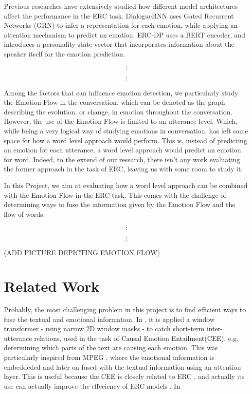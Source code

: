\documentclass[oneside, a4paper, onecolumn, 11pt]{article}
\begin{document}
Previous researches have extensively studied how different model architectures affect the performance in the ERC task. 
DialogueRNN \cite{majumder2019dialoguernnattentivernnemotion} uses Gated Recurrent Networks (GRN) to infer a representation for 
each emotion, while applying an attention mechanism to predict an emotion. ERC-DP \cite{wang2021t2vladgloballocalsequencealignment} 
uses a BERT encoder, and introduces a personality state vector that incorporates information about the speaker itself for the 
emotion prediction.



$$\vdots$$

$$\vdots$$

Among the factors that can influence emotion detection, we particularly study the Emotion Flow in the conversation, which can be
denoted as the graph describing the evolution, or change, in emotion throughout the conversation. However, the use of the Emotion 
Flow is limited to an utterance level. Which, while being a very logical way of studying emotions in conversation, has left some 
space for how a word level approach would perform. This is, instead of predicting an emotion for each utterance, a word level approach 
would predict an emotion for word. Indeed, to the extend of our research, there isn't any work evaluating the former approach in the 
task of ERC, leaving us with some room to study it.

In this Project, we aim at evaluating how a word level approach can be combined with the Emotion Flow in the ERC task. This comes with 
the challenge of determining ways to fuse the information given by the Emotion Flow and the flow of words. 

$$\vdots$$

$$\vdots$$

(ADD PICTURE DEPICTING EMOTION FLOW)

\section{Related Work} 
Probably, the most challenging problem in this project is to find efficient ways to fuse the textual and emotional information. 
In \cite{LIU2025126924}, it is applied a window transformer - using narrow 2D window masks - to catch short-term inter-utterance relations, 
used in the task of Causal Emotion Entailment(CEE), e.g. determining which parts of the text are causing each emotion. This was 
particularly inspired from MPEG \cite{10252019}, where the emotional information is embeddeded and later on fused with the textual 
information using an attention layer. This is useful because the CEE is closely related to ERC , and actually its use can actually 
improve the effeciency of ERC models \cite{LIU2025126924}. In 
\end{document}
